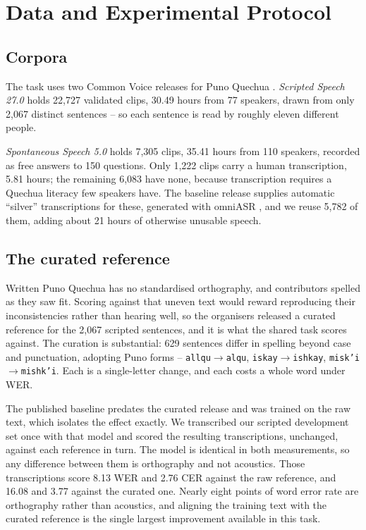 \section{Data and Experimental Protocol}
\label{sec:data}

\subsection{Corpora}

The task uses two Common Voice \cite{ardila2020commonvoice} releases for Puno
Quechua \cite{huaman2026quechua}. \emph{Scripted Speech 27.0} holds 22{,}727 validated clips, 30.49 hours from 77
speakers, drawn from only 2{,}067 distinct sentences -- so each sentence is read
by roughly eleven different people.

\emph{Spontaneous Speech 5.0} holds 7{,}305 clips, 35.41 hours from 110
speakers, recorded as free answers to 150 questions. Only 1{,}222 clips carry a human transcription, 5.81 hours; the remaining
6{,}083 have none, because transcription requires a Quechua literacy few
speakers have. The baseline
release supplies automatic ``silver'' transcriptions for these, generated with
omniASR \cite{keren2025omnilingual}, and we reuse 5{,}782 of them, adding about 21 hours of otherwise unusable speech.

\subsection{The curated reference}
\label{sec:curated}

Written Puno Quechua has no standardised orthography, and contributors spelled
as they saw fit. Scoring against that uneven text would reward reproducing
their inconsistencies rather than hearing well, so the organisers released a
curated reference for the 2{,}067 scripted sentences, and it is what the shared
task scores against. The curation is substantial: 629 sentences differ in spelling beyond case and punctuation,
adopting Puno forms --
\texttt{allqu}$\rightarrow$\texttt{alqu},
\texttt{iskay}$\rightarrow$\texttt{ishkay},
\texttt{misk'i}$\rightarrow$\texttt{mishk'i}. Each is a single-letter change,
and each costs a whole word under WER.

The published baseline predates the curated release and was trained on the raw
text, which isolates the effect exactly. We transcribed our scripted
development set once with that model and scored the resulting transcriptions,
unchanged, against each reference in turn. The model is identical in both
measurements, so any difference between them is orthography and not acoustics.
Those transcriptions score
8.13 WER and 2.76 CER against the raw reference, and 16.08 and 3.77 against the
curated one. Nearly eight points of word error rate are orthography rather than
acoustics, and aligning the training text with the curated reference is the
single largest improvement available in this task.

